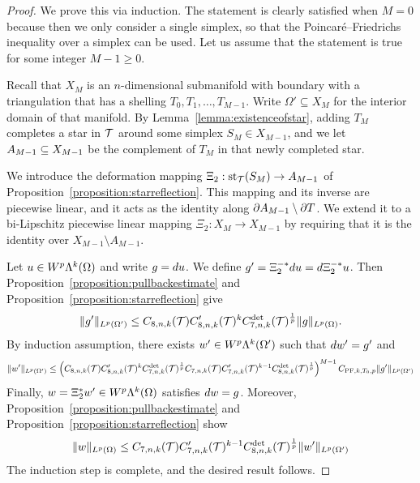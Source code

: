 \documentclass[10pt,a4paper]{article}
\begin{document}
\begin{proof}
    We prove this via induction. 
    The statement is clearly satisfied when $M=0$ because then we only consider a single simplex,
    so that the Poincar\'e--Friedrichs inequality over a simplex can be used. 
    Let us assume that the statement is true for some integer $M-1 \geq 0$.
    
    
    Recall that $X_M$ is an $n$-dimensional submanifold with boundary with a triangulation that has a shelling $T_0, T_1, \dots, T_{M-1}$. 
    Write $\Omega' \subseteq X_{M}$ for the interior domain of that manifold. 
    By Lemma~\ref{lemma:existenceofstar}, adding $T_{M}$ completes a star in ${\mathcal T}$ around some simplex $S_{M} \in X_{M-1}$, 
    and we let $A_{M-1} \subseteq X_{M-1}$ be the complement of $T_{M}$ in that newly completed star. 
    
    We introduce the deformation mapping $\Xi_{2} : \operatorname{st}_{{\mathcal T}}(S_M) \rightarrow A_{M-1}$ of Proposition~\ref{proposition:starreflection}. 
    This mapping and its inverse are piecewise linear, and it acts as the identity along $\partial A_{M-1} \setminus \partial T$.
    We extend it to a bi-Lipschitz piecewise linear mapping $\Xi_{2} : X_{M} \rightarrow X_{M-1}$ by requiring that it is the identity over $X_{M-1} \setminus A_{M-1}$.
    
    Let $u \in W^{p}\Lambda^{k}(\Omega)$ and write $g = d u$. We define $g' = \Xi_{2}^{-\ast} d u = d \Xi_{2}^{-\ast} u$. 
    Then Proposition~\ref{proposition:pullbackestimate} and Proposition~\ref{proposition:starreflection} give  
    \begin{align*}
        \| g' \|_{L^{p}(\Omega')}  
        \leq 
        C_{8,n,k}({\mathcal T})
        C'_{8,n,k}({\mathcal T})^{k} 
        C^{\det}_{7,n,k}({\mathcal T})^{\frac 1 p} 
        \| g \|_{L^{p}(\Omega)}  
        .
    \end{align*}
    By induction assumption, there exists $w' \in W^{p}\Lambda^{k}(\Omega')$ such that $d w' = g'$ and 
    \begin{align*}
        \| w' \|_{L^{p}(\Omega')} 
        \leq 
        \left( 
        C_{8,n,k}({\mathcal T})
        C'_{8,n,k}({\mathcal T})^{k} 
        C^{\det}_{7,n,k}({\mathcal T})^{\frac 1 p} 
        C_{7,n,k}({\mathcal T})
        C'_{7,n,k}({\mathcal T})^{k-1} 
        C^{\det}_{8,n,k}({\mathcal T})^{\frac 1 p} 
        \right)^{M-1}
        C_{{{\rm PF}},k,T_{0},p}
        \| g' \|_{L^{p}(\Omega')}  
    \end{align*}
    Finally, $w = \Xi_{2}^{\ast} w' \in W^{p}\Lambda^{k}(\Omega)$ satisfies $d w = g$.
    Moreover, Proposition~\ref{proposition:pullbackestimate} and Proposition~\ref{proposition:starreflection} show 
    \begin{align*}
        \| w \|_{L^{p}(\Omega)}  
        \leq 
        C_{7,n,k}({\mathcal T})
        C'_{7,n,k}({\mathcal T})^{k-1} 
        C^{\det}_{8,n,k}({\mathcal T})^{\frac 1 p} 
        \| w' \|_{L^{p}(\Omega')} 
    \end{align*}
    The induction step is complete, and the desired result follows. 
\end{proof}
\end{document}
